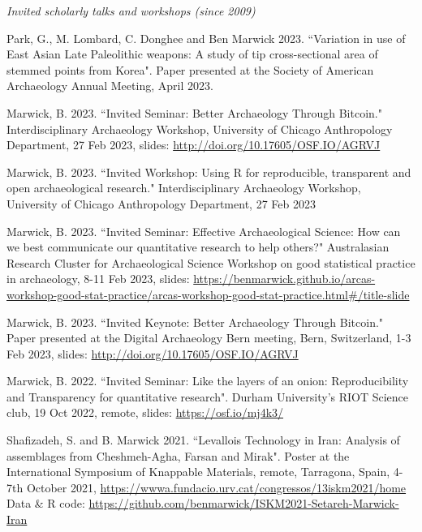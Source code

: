 

\medskip

\noindent\emph{Invited scholarly talks and workshops (since 2009)\vspace{0.01in}}

\medskip

\ind Park, G., M. Lombard, C. Donghee and Ben Marwick 2023. ``Variation in use of East Asian Late Paleolithic weapons: A study of tip cross-sectional area of stemmed points from Korea". Paper presented at the Society of American Archaeology Annual Meeting, April 2023. 

\ind Marwick, B. 2023. ``Invited Seminar: Better Archaeology Through Bitcoin." Interdisciplinary Archaeology Workshop, University of Chicago Anthropology Department, 27 Feb 2023, slides: \url{http://doi.org/10.17605/OSF.IO/AGRVJ}  

\ind Marwick, B. 2023. ``Invited Workshop: Using R for reproducible, transparent and open archaeological research." Interdisciplinary Archaeology Workshop, University of Chicago Anthropology Department, 27 Feb 2023 

\ind Marwick, B. 2023. ``Invited Seminar: Effective Archaeological Science: How can we best communicate our quantitative research to help others?" Australasian Research Cluster for Archaeological Science Workshop on good statistical practice in archaeology, 8-11 Feb 2023, slides: \url{https://benmarwick.github.io/arcas-workshop-good-stat-practice/arcas-workshop-good-stat-practice.html#/title-slide}  

\ind Marwick, B. 2023. ``Invited Keynote: Better Archaeology Through Bitcoin." Paper presented at the Digital Archaeology Bern meeting, Bern, Switzerland, 1-3 Feb 2023, slides: \url{http://doi.org/10.17605/OSF.IO/AGRVJ}

\ind Marwick, B. 2022. ``Invited Seminar: Like the layers of an onion: Reproducibility and Transparency for quantitative research". Durham University’s RIOT Science club, 19 Oct 2022, remote, slides: \url{https://osf.io/mj4k3/}  

\ind Shafizadeh, S. and B. Marwick 2021. ``Levallois Technology in Iran: Analysis of assemblages from Cheshmeh-Agha, Farsan and Mirak". Poster at the International Symposium of Knappable Materials, remote, Tarragona, Spain, 4-7th October 2021,  \url{https://wwwa.fundacio.urv.cat/congressos/13iskm2021/home}  Data \& R code:  \url{https://github.com/benmarwick/ISKM2021-Setareh-Marwick-Iran}  

